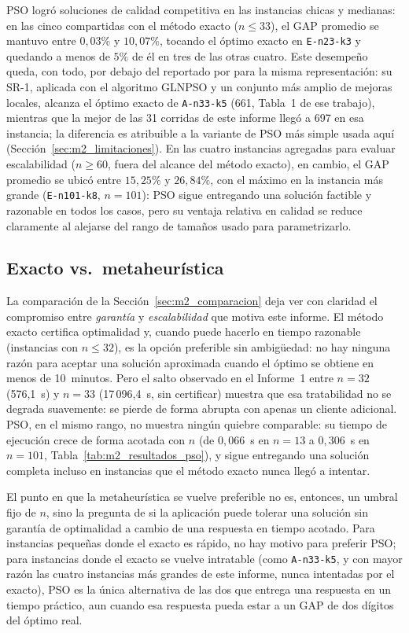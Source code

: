 PSO logró soluciones de calidad competitiva en las instancias chicas y medianas: en las
cinco compartidas con el método exacto ($n\le33$), el GAP promedio se mantuvo entre
$0{,}03\%$ y $10{,}07\%$, tocando el óptimo exacto en \texttt{E-n23-k3} y quedando a menos
de $5\%$ de él en tres de las otras cuatro. Este desempeño queda, con todo, por debajo
del reportado por \textcite{ai2009particle} para la misma representación: su SR-1,
aplicada con el algoritmo GLNPSO y un conjunto más amplio de mejoras locales, alcanza el
óptimo exacto de \texttt{A-n33-k5} (661, Tabla~1 de ese trabajo), mientras que la mejor
de las 31 corridas de este informe llegó a 697 en esa instancia; la diferencia es
atribuible a la variante de PSO más simple usada aquí
(Sección~\ref{sec:m2_limitaciones}). En las cuatro instancias agregadas para evaluar
escalabilidad ($n\ge60$, fuera del alcance del método exacto), en cambio, el GAP
promedio se ubicó entre $15{,}25\%$ y $26{,}84\%$, con el máximo en la instancia más
grande (\texttt{E-n101-k8}, $n=101$): PSO sigue entregando una solución factible y
razonable en todos los casos, pero su ventaja relativa en calidad se reduce claramente al
alejarse del rango de tamaños usado para parametrizarlo.

\subsection{Exacto vs.\ metaheurística}

La comparación de la Sección~\ref{sec:m2_comparacion} deja ver con claridad el
compromiso entre \textit{garantía} y \textit{escalabilidad} que motiva este informe. El
método exacto certifica optimalidad y, cuando puede hacerlo en tiempo razonable
(instancias con $n\le32$), es la opción preferible sin ambigüedad: no hay ninguna razón
para aceptar una solución aproximada cuando el óptimo se obtiene en menos de 10~minutos.
Pero el salto observado en el Informe~1 entre $n=32$ (576{,}1~s) y $n=33$ (17\,096{,}4~s,
sin certificar) muestra que esa tratabilidad no se degrada suavemente: se pierde de forma
abrupta con apenas un cliente adicional. PSO, en el mismo rango, no muestra ningún
quiebre comparable: su tiempo de ejecución crece de forma acotada con $n$ (de $0{,}066$~s
en $n=13$ a $0{,}306$~s en $n=101$, Tabla~\ref{tab:m2_resultados_pso}), y sigue entregando
una solución completa incluso en instancias que el método exacto nunca llegó a intentar.

El punto en que la metaheurística se vuelve preferible no es, entonces, un umbral fijo de
$n$, sino la pregunta de si la aplicación puede tolerar una solución sin garantía de
optimalidad a cambio de una respuesta en tiempo acotado. Para instancias pequeñas donde el
exacto es rápido, no hay motivo para preferir PSO; para instancias donde el exacto se
vuelve intratable (como \texttt{A-n33-k5}, y con mayor razón las cuatro instancias más
grandes de este informe, nunca intentadas por el exacto), PSO es la única alternativa de
las dos que entrega una respuesta en un tiempo práctico, aun cuando esa respuesta pueda
estar a un GAP de dos dígitos del óptimo real.

